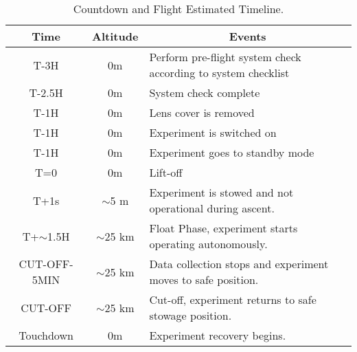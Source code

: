 \begin{table}[H]
\centering


\begin{tabular}{|l|l|l|}
\hline
\multicolumn{1}{|c|}{\textbf{Time}}       & \multicolumn{1}{c|}{\textbf{Altitude}}      & \multicolumn{1}{c|}{\textbf{Events}}                              \\ \hline
\multicolumn{1}{|c|}{T-3H}    & \multicolumn{1}{c|}{0m}             & Perform pre-flight system check according to system checklist                      \\ \hline           
\multicolumn{1}{|c|}{T-2.5H}    & \multicolumn{1}{c|}{0m}             & System check complete                    \\ \hline           
\multicolumn{1}{|c|}{T-1H}    & \multicolumn{1}{c|}{0m}             & Lens cover is removed                     \\ \hline           
\multicolumn{1}{|c|}{T-1H}    & \multicolumn{1}{c|}{0m}             & Experiment is switched on                                \\ \hline
\multicolumn{1}{|c|}{T-1H}    & \multicolumn{1}{c|}{0m}             & Experiment goes to standby mode                          \\ \hline
\multicolumn{1}{|c|}{T=0}        & \multicolumn{1}{c|}{0m}             & Lift-off                                              \\ \hline
\multicolumn{1}{|c|}{T+1s}       & \multicolumn{1}{c|}{$\sim$5 m} & Experiment is stowed and not operational during ascent.                  \\ \hline
\multicolumn{1}{|c|}{T+$\sim$1.5H}                     & \multicolumn{1}{c|}{$\sim$25 km}                        & Float Phase, experiment starts operating autonomously.                                           \\ \hline
\multicolumn{1}{|c|}{CUT-OFF-5MIN}                     & \multicolumn{1}{c|}{$\sim$25 km}                        & Data collection stops and experiment moves to safe position.                                                \\ \hline
\multicolumn{1}{|c|}{CUT-OFF}                     & \multicolumn{1}{c|}{$\sim$25 km}                        & Cut-off, experiment returns to safe stowage position.                                                 \\ \hline
\multicolumn{1}{|c|}{Touchdown}                     &  \multicolumn{1}{c|}{0m}                        &  Experiment recovery begins.                \\ \hline
\end{tabular}
\caption{Countdown and Flight Estimated Timeline.}
\label{tab:countflight}
\end{table}
\raggedbottom

